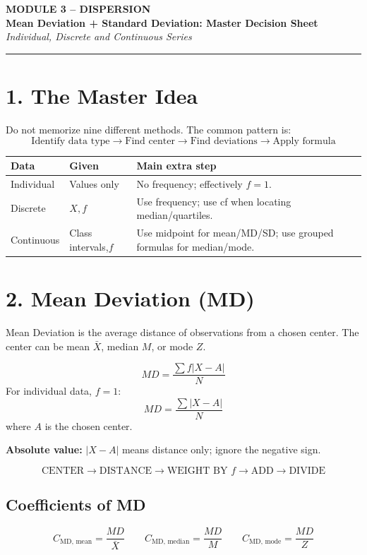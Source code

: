 \documentclass[10pt,a4paper]{article}
\newcommand{\F}[1]{\[\boxed{\displaystyle #1}\]}
\begin{document}
\begin{center}
{\Large\textbf{MODULE 3 -- DISPERSION}}\\
{\large\textbf{Mean Deviation + Standard Deviation: Master Decision Sheet}}\\
\textit{Individual, Discrete and Continuous Series}
\end{center}\hrule

\section*{1. The Master Idea}
Do not memorize nine different methods. The common pattern is:
\[
\boxed{\text{Identify data type}\rightarrow\text{Find center}\rightarrow
\text{Find deviations}\rightarrow\text{Apply formula}}
\]

\begin{center}
\begin{tabular}{p{2.4cm}p{3.5cm}p{7cm}}
\toprule
\textbf{Data}&\textbf{Given}&\textbf{Main extra step}\\ \midrule
Individual&Values only&No frequency; effectively $f=1$.\\
Discrete&$X,f$&Use frequency; use cf when locating median/quartiles.\\
Continuous&Class intervals,$f$&Use midpoint for mean/MD/SD; use grouped formulas for median/mode.\\
\bottomrule
\end{tabular}
\end{center}

\section*{2. Mean Deviation (MD)}
Mean Deviation is the average distance of observations from a chosen center.
The center can be mean $\bar X$, median $M$, or mode $Z$.

\F{MD=\frac{\sum f|X-A|}{N}}
For individual data, $f=1$:
\F{MD=\frac{\sum|X-A|}{N}}
where $A$ is the chosen center.

\textbf{Absolute value:} $|X-A|$ means distance only; ignore the negative sign.

\[
\boxed{\text{CENTER}\rightarrow\text{DISTANCE}\rightarrow
\text{WEIGHT BY }f\rightarrow\text{ADD}\rightarrow\text{DIVIDE}}
\]

\subsection*{Coefficients of MD}
\[
\boxed{C_{\text{MD, mean}}=\frac{MD}{\bar X}}
\qquad
\boxed{C_{\text{MD, median}}=\frac{MD}{M}}
\qquad
\boxed{C_{\text{MD, mode}}=\frac{MD}{Z}}
\]
\end{document}
